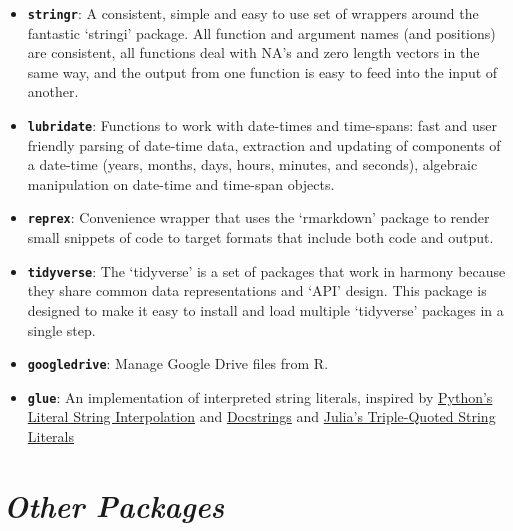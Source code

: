 \documentclass[
  letterpaper,
  DIV=11,
  numbers=noendperiod]{scrreprt}
\begin{document}
\begin{itemize}
\item
  \textbf{\texttt{stringr}}: A consistent, simple and easy to use set of
  wrappers around the fantastic `stringi' package. All function and
  argument names (and positions) are consistent, all functions deal with
  NA's and zero length vectors in the same way, and the output from one
  function is easy to feed into the input of another.
\item
  \textbf{\texttt{lubridate}}: Functions to work with date-times and
  time-spans: fast and user friendly parsing of date-time data,
  extraction and updating of components of a date-time (years, months,
  days, hours, minutes, and seconds), algebraic manipulation on
  date-time and time-span objects.
\item
  \textbf{\texttt{reprex}}: Convenience wrapper that uses the
  `rmarkdown' package to render small snippets of code to target formats
  that include both code and output.
\item
  \textbf{\texttt{tidyverse}}: The `tidyverse' is a set of packages that
  work in harmony because they share common data representations and
  `API' design. This package is designed to make it easy to install and
  load multiple `tidyverse' packages in a single step.
\item
  \textbf{\texttt{googledrive}}: Manage Google Drive files from R.
\item
  \textbf{\texttt{glue}}: An implementation of interpreted string
  literals, inspired by
  \href{https://www.python.org/dev/peps/pep-0498/}{Python's Literal
  String Interpolation} and
  \href{https://www.python.org/dev/peps/pep-0257/}{Docstrings} and
  \href{https://docs.julialang.org/en/v1.3/manual/strings/\#Triple-Quoted-String-Literals-1}{Julia's
  Triple-Quoted String Literals}
\end{itemize}

\hypertarget{other-packages}{%
\section{\texorpdfstring{\emph{Other
Packages}}{Other Packages}}\label{other-packages}}
\end{document}
